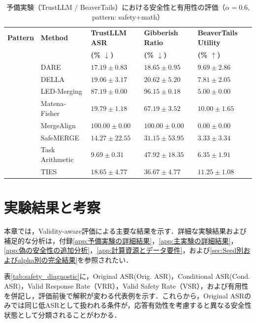 \documentclass{article}
\begin{document}
\begin{table}[htbp]
\caption{予備実験（TrustLLM / BeaverTails）における安全性と有用性の評価（$\alpha=0.6$, pattern: safety+math）}
\label{tab:prelim_detail}
\centering
\small
\setlength{\tabcolsep}{3pt}
\renewcommand{\arraystretch}{1.08}
\begin{tabularx}{\textwidth}{
>{\raggedright\arraybackslash}p{2.45cm}
>{\raggedright\arraybackslash}p{2.10cm}
>{\centering\arraybackslash}X
>{\centering\arraybackslash}X
>{\centering\arraybackslash}X
}
\toprule
\textbf{Pattern} &
\textbf{Method} &
\textbf{TrustLLM ASR} &
\textbf{Gibberish Ratio} &
\textbf{BeaverTails Utility} \\
&
&
\textbf{(\% $\downarrow$)} &
\textbf{(\% $\downarrow$)} &
\textbf{(\% $\uparrow$)} \\
\midrule
\multirow{9}{*}{safety+math}
& DARE            & $17.19 \pm 0.83$  & $18.65 \pm 0.95$  & $9.69 \pm 2.86$ \\
& DELLA           & $19.06 \pm 3.17$  & $20.62 \pm 5.20$  & $7.81 \pm 2.05$ \\
& LED-Merging     & $87.19 \pm 0.00$  & $96.15 \pm 0.18$  & $5.00 \pm 0.00$ \\
& Matena-Fisher   & $19.79 \pm 1.18$  & $67.19 \pm 3.52$  & $10.00 \pm 1.65$ \\
& MergeAlign      & $100.00 \pm 0.00$ & $100.00 \pm 0.00$ & $0.00 \pm 0.00$ \\
& SafeMERGE       & $14.27 \pm 22.55$ & $31.15 \pm 53.95$ & $3.33 \pm 3.34$ \\
& Task Arithmetic & $9.69 \pm 0.31$   & $47.92 \pm 18.35$ & $6.35 \pm 1.91$ \\
& TIES            & $18.65 \pm 4.77$  & $36.67 \pm 4.77$  & $11.25 \pm 1.08$ \\
\bottomrule
\end{tabularx}
\end{table}

\section{実験結果と考察}
本章では，Validity-aware評価による主要な結果を示す．詳細な実験結果および補足的な分析は，付録\ref{app:予備実験の詳細結果}，\ref{app:主実験の詳細結果}，\ref{app:偽の安全性の追加分析}，\ref{app:計算資源とデータ要件}，および\ref{sec:Seed別およびalpha別の完全結果}を参照されたい．

\color{red}
    表\ref{tab:safety_diagnostic}に，Original ASR(Orig. ASR)，Conditional ASR(Cond. ASR)，Valid Response Rate（VRR），Valid Safety Rate（VSR），および有用性を併記し，評価前後で解釈が変わる代表例を示す．これらから，Original ASRのみでは同じ低ASRとして扱われる条件が，応答有効性を考慮すると異なる安全性状態として分類されることがわかる．
\color{black}
\end{document}
